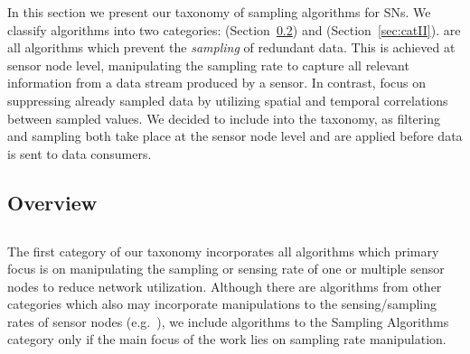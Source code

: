 In this section we present our taxonomy of sampling algorithms for \acp{SN}. We
classify algorithms into two categories: \catI (Section~\ref{sec:catI}) and
\catII (Section~\ref{sec:catII}). %
\catI are all algorithms which prevent the \textit{sampling} of redundant data.
This is achieved at sensor node level, manipulating the sampling rate to
capture all relevant information from a data stream produced by a sensor. In
contrast, \catII focus on suppressing already sampled data by utilizing spatial
and temporal correlations between sampled values. We decided to include \catII
into the taxonomy, as filtering and sampling both take place at the sensor node
level and are applied before data is sent to data consumers.



\subsection{Overview}
\label{sec:Overview}


\subsection{\catI} %
\label{sec:catI}

The first category of our taxonomy incorporates all algorithms which primary
focus is on manipulating the sampling or sensing rate of one or multiple sensor
nodes to reduce network utilization. Although there are algorithms from other
categories which also may incorporate manipulations to the sensing/sampling
rates of sensor nodes (e.g.~\cite{trihinas2015adam, jain2004adaptive}), we
include algorithms to the Sampling Algorithms category only if the main focus
of the work lies on sampling rate manipulation. %

